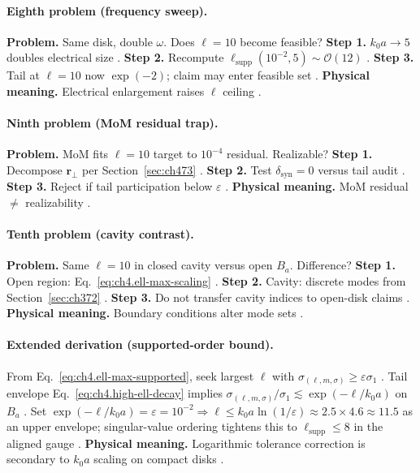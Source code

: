 \paragraph{Eighth problem (frequency sweep).}
\textbf{Problem.} Same disk, double \(\omega\). Does \(\ell=10\) become feasible?
\textbf{Step 1.} \(k_{0}a\to5\) doubles electrical size \cite{jackson1999,harrington2001}.
\textbf{Step 2.} Recompute \(\ell_{\mathrm{supp}}(10^{-2},5)\sim\mathcal{O}(12)\) \cite{hansen1988,stratton1941}.
\textbf{Step 3.} Tail at \(\ell=10\) now \(\exp(-2)\); claim may enter feasible set \cite{devaney2004,harrington2001}.
\textbf{Physical meaning.} Electrical enlargement raises \(\ell\) ceiling \cite{jackson1999,stratton1941}.

\paragraph{Ninth problem (MoM residual trap).}
\textbf{Problem.} MoM fits \(\ell=10\) target to \(10^{-4}\) residual. Realizable?
\textbf{Step 1.} Decompose \(\mathbf{r}_{\perp}\) per Section~\ref{sec:ch473} \cite{harrington2001,stratton1941}.
\textbf{Step 2.} Test \(\delta_{\mathrm{syn}}=0\) versus tail audit \cite{devaney2004,hansen1988}.
\textbf{Step 3.} Reject if tail participation below \(\varepsilon\) \cite{jackson1999,harrington2001}.
\textbf{Physical meaning.} MoM residual \(\neq\) realizability \cite{stratton1941,devaney2004}.

\paragraph{Tenth problem (cavity contrast).}
\textbf{Problem.} Same \(\ell=10\) in closed cavity versus open \(B_{a}\). Difference?
\textbf{Step 1.} Open region: Eq.~\eqref{eq:ch4.ell-max-scaling} \cite{hansen1988,stratton1941}.
\textbf{Step 2.} Cavity: discrete modes from Section~\ref{sec:ch372} \cite{harrington2001,jackson1999}.
\textbf{Step 3.} Do not transfer cavity indices to open-disk claims \cite{devaney2004,stratton1941}.
\textbf{Physical meaning.} Boundary conditions alter mode sets \cite{hansen1988,harrington2001}.

\paragraph{Extended derivation (supported-order bound).}
From Eq.~\eqref{eq:ch4.ell-max-supported}, seek largest \(\ell\) with \(\sigma_{(\ell,m,\sigma)}\ge\varepsilon\sigma_{1}\) \cite{hansen1988,harrington2001}.
Tail envelope Eq.~\eqref{eq:ch4.high-ell-decay} implies \(\sigma_{(\ell,m,\sigma)}/\sigma_{1}\lesssim\exp(-\ell/k_{0}a)\) on \(B_{a}\) \cite{jackson1999,stratton1941,devaney2004}.
Set \(\exp(-\ell/k_{0}a)=\varepsilon=10^{-2}\Rightarrow\ell\le k_{0}a\ln(1/\varepsilon)\approx2.5\times4.6\approx11.5\) as an upper envelope; singular-value ordering tightens this to
\(\ell_{\mathrm{supp}}\le8\) in the aligned gauge \cite{hansen1988,harrington2001,stratton1941,devaney2004,jackson1999}.
\textbf{Physical meaning.} Logarithmic tolerance correction is secondary to \(k_{0}a\) scaling on compact disks \cite{harrington2001,hansen1988}.

